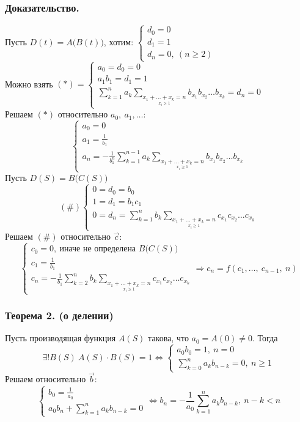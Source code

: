 \documentclass[12pt, letterpaper, twoside]{article}
\newcommand{\DS}{\displaystyle}
\begin{document}
    \subsubsection*{Доказательство.}
    Пусть $D(t) = A\big( B(t) \big)$, хотим:
    $\begin{cases}
        d_0 = 0\\
        d_1 = 1\\
        d_n = 0,\ (n\geq 2)
    \end{cases}$\\
    Можно взять
    $(*) = \begin{cases}
        a_0 = d_0 = 0\\
        a_1 b_1 = d_1 = 1\\
        \DS \sum_{k = 1}^{n} a_k \sum_{\underset{x_i \geq 1}{x_1 + \dots + x_k = n}} b_{x_1} b_{x_2}\dots b_{x_k} = d_n = 0
    \end{cases}$\\
    Решаем $(*)$ относительно $a_0,\ a_1,\dots:$
    \[\begin{cases}
        a_0 = 0\\
        a_1 = \frac{1}{b_1}\\
        a_n = -\frac{1}{b_1^n}\DS \sum_{k = 1}^{n - 1} a_k \sum_{\underset{x_i \geq 1}{x_1 + \dots + x_k = n}} b_{x_1} b_{x_2}\dots b_{x_k}
    \end{cases}\] 
    Пусть $D(S) = B\big(C(S)\big)$
    \[(\#)\begin{cases}
        0 = d_0 = b_0\\
        1 = d_1 = b_1 c_1\\
        0 = d_n = \DS \sum_{k = 1}^{n} b_k \sum_{\underset{x_i \geq 1}{x_1 + \dots + x_k = n}} c_{x_1} c_{x_2}\dots c_{x_k}
    \end{cases}\]
    Решаем $(\#)$ относительно $\vec{c}$:
    \[\begin{cases}
        c_0 = 0,\ \text{иначе не определена } B\big(C(S)\big) \\
        c_1 = \frac{1}{b_1}\\
        c_n = -\frac{1}{b_1} \DS \sum_{k = 2}^{n} b_k \sum_{\underset{x_i \geq 1}{x_1 + \dots + x_k = n}} c_{x_1} c_{x_2}\dots c_{x_k}
    \end{cases}\Rightarrow c_n = f(c_1,\dots,\ c_{n - 1},\ n)\]
    \subsubsection*{Теорема 2. (о делении)}
    Пусть производящая функция $A(S)$ такова, что $a_0 = A(0) \neq 0$. Тогда
    \[\exists! B(S)\ A(S) \cdot B(S) = 1\Leftrightarrow \begin{cases}
        a_0 b_0 = 1,\ n = 0\\
        \DS\sum_{k = 0}^{n} a_k b_{n - k} = 0,\ n \geq 1
    \end{cases}\]
    Решаем относительно $\vec{b}$:
    \[\begin{cases}
        b_0 = \frac{1}{a_0}\\
        a_0 b_n + \sum_{k  =1}^n a_k b_{n - k} = 0
    \end{cases}\Leftrightarrow b_n = -\frac{1}{a_0}\sum_{k = 1}^n a_k b_{n - k},\ n - k < n\]
\end{document}
